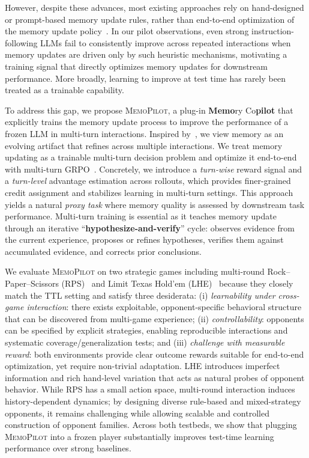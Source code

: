 \documentclass{article}
\newcommand{\methodname}{MemoPilot}
\newcommand{\method}{\textsc{\methodname}}
\theoremstyle{plain}
\theoremstyle{definition}
\theoremstyle{remark}
\begin{document}
However, despite these advances, most existing approaches rely on hand-designed or prompt-based memory update rules, rather than end-to-end optimization of the memory update policy~\citep{suzgun2025dynamic,ouyang2026reasoningbank}. In our pilot observations, even strong instruction-following LLMs fail to consistently improve across repeated interactions when memory updates are driven only by such heuristic mechanisms, motivating a training signal that directly optimizes memory updates for downstream performance. More broadly, learning to improve at test time has rarely been treated as a trainable capability.

To address this gap, we propose \method{}, a plug-in \textbf{Memo}ry Co\textbf{pilot} that explicitly trains the memory update process to improve the performance of a frozen LLM in multi-turn interactions. Inspired by~\citet{suzgun2025dynamic}, we view memory as an evolving artifact that refines across multiple interactions. We treat memory updating as a trainable multi-turn decision problem and optimize it end-to-end with multi-turn GRPO~\citep{shao2024deepseekmath}. Concretely, we introduce a \emph{turn-wise} reward signal and a \emph{turn-level} advantage estimation across rollouts, which provides finer-grained credit assignment and stabilizes learning in multi-turn settings. This approach yields a natural \emph{proxy task} where memory quality is assessed by downstream task performance. Multi-turn training is essential as it teaches memory update through an iterative ``\textbf{hypothesize-and-verify}'' cycle: observes evidence from the current experience, proposes or refines hypotheses, verifies them against accumulated evidence, and corrects prior conclusions.

We evaluate \method{} on two strategic games including multi-round Rock--Paper--Scissors (RPS)~\citep{guertler2025textarena} and Limit Texas Hold’em (LHE)~\citep{zha2019rlcard} because they closely match the TTL setting and satisfy three desiderata: (i) \emph{learnability under cross-game interaction}: there exists exploitable, opponent-specific behavioral structure that can be discovered from multi-game experience; (ii) \emph{controllability}: opponents can be specified by explicit strategies, enabling reproducible interactions and systematic coverage/generalization tests; and (iii) \emph{challenge with measurable reward}: both environments provide clear outcome rewards suitable for end-to-end optimization, yet require non-trivial adaptation. LHE introduces imperfect information and rich hand-level variation that acts as natural probes of opponent behavior. While RPS has a small action space, multi-round interaction induces history-dependent dynamics; by designing diverse rule-based and mixed-strategy opponents, it remains challenging while allowing scalable and controlled construction of opponent families. Across both testbeds, we show that plugging \method{} into a frozen player substantially improves test-time learning performance over strong baselines. 
\end{document}
